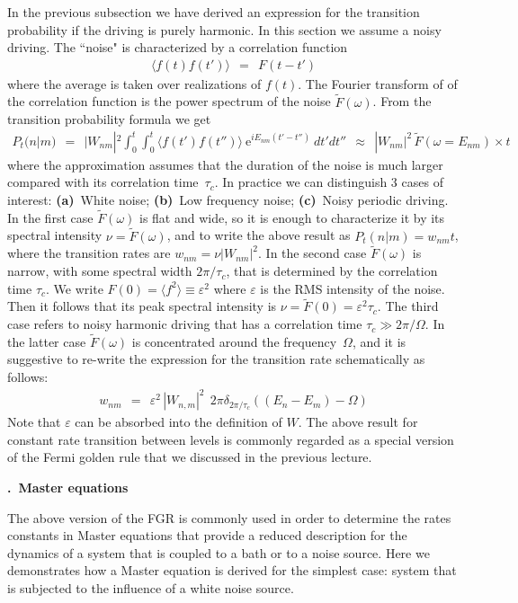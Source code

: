 \documentclass[onecolumn,fleqn, 11pt]{revtex4}
\newcommand{\eexp}{\mathrm{e}^}
\newcommand{\beq}{\begin{eqnarray}}
\newcommand{\eeq}{\end{eqnarray}}
\renewcommand{\thesubsection}{\arabic{subsection}}
\renewcommand{\thesubsubsection}{\arabic{subsubsection}}
\newcommand{\sheadC}[1]
{
\addtocounter{subsubsection}{1}
\vspace{5mm}
{\bf \thesubsection.\thesubsubsection \ #1}  
\nopagebreak
\phantomsection
}
\begin{document}
In the previous subsection we have derived an expression 
for the transition probability if the driving is 
purely harmonic. In this section we assume 
a noisy driving. The ``noise"  is characterized by  
a correlation function 
\beq
\langle f(t)f(t') \rangle \ \ = \ \  F(t-t')  
\eeq
where the average is taken over realizations of $f(t)$.  
The Fourier transform of of the correlation function 
is the power spectrum  of the noise $\tilde{F}(\omega)$.
From the  transition probability formula we get 
\beq
P_t(n|m) \ \ = \ \ 
|W_{nm}|^2 \int_0^t\int_0^t  \langle f(t')f(t'')\rangle \ \eexp{iE_{nm}(t'-t'')} \ dt'dt''
\ \ \approx \ \ 
|W_{nm}|^2  \, \tilde{F}(\omega{=}E_{nm}) \times t
\eeq
where the approximation assumes that the duration of the noise 
is much larger compared with its correlation time~$\tau_c$.  
In practice we can distinguish 3 cases of interest: 
{\bf (a)}~White noise; 
{\bf (b)}~Low frequency noise; 
{\bf (c)}~Noisy periodic driving. 
In the first case $\tilde{F}(\omega)$ is flat and wide, 
so it is enough to characterize it by its spectral 
intensity ${\nu=\tilde{F}(\omega)}$, and to write the above 
result as ${P_t(n|m) = w_{nm}t}$, where the transition rates  
are ${w_{nm}=\nu|W_{nm}|^2}$. 
In the second case $\tilde{F}(\omega)$ is narrow, 
with some spectral width $2\pi/\tau_c$, that is determined 
by the correlation time $\tau_c$. 
We write ${F(0)= \langle f^2 \rangle \equiv \varepsilon^2}$
where $\varepsilon$ is the RMS intensity of the noise. 
Then it follows that its peak spectral intensity
is ${\nu=\tilde{F}(0)=\varepsilon^2 \tau_c}$. 
The third case refers to noisy harmonic driving 
that has a correlation time ${\tau_c \gg 2\pi/\Omega}$. 
In the latter case $\tilde{F}(\omega)$ is concentrated 
around the frequency~$\Omega$,  
and it is suggestive to re-write the expression for 
the transition rate schematically as follows:  
\beq
w_{nm}
\ \  = \ \ 
\varepsilon^2 \, |W_{n,m}|^2  \ \ 2\pi \delta_{2\pi/\tau_c}((E_{n}-E_{m})-\Omega) 
\eeq
Note that $\varepsilon$ can be absorbed into the definition of $W$. 
The above result for constant rate transition between levels  
is commonly regarded as a special version of the Fermi golden rule 
that we discussed in the previous lecture.   



\sheadC{Master equations} 

The above version of the FGR is commonly used in order to determine 
the rates constants in Master equations that 
provide a reduced description for the dynamics   
of a system that is coupled to a bath or to a noise source. 
Here we demonstrates how a Master equation is derived 
for the simplest case: system that is subjected  
to the influence of a white noise source. 
\end{document}
